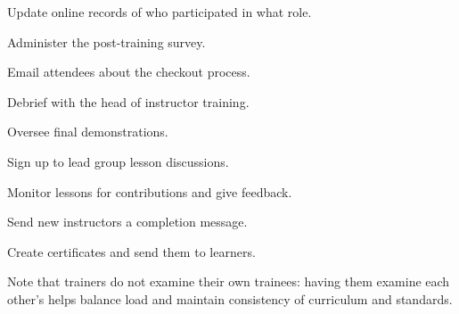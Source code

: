 
\begin{genumerate}

\item
  Update online records of who participated in what role.

\item
  Administer the post-training survey.

\item
  Email attendees about the checkout process.

\item
  Debrief with the head of instructor training.

\item
  Oversee final demonstrations.

\end{genumerate}


\begin{genumerate}

\item
  Sign up to lead group lesson discussions.

\item
  Monitor lessons for contributions and give feedback.

\end{genumerate}


\begin{genumerate}

\item
  Send new instructors a completion message.

\item
  Create certificates and send them to learners.

\end{genumerate}

Note that trainers do not examine their own trainees: having them
examine each other's helps balance load and maintain consistency of
curriculum and standards.
